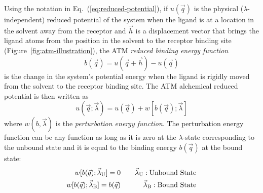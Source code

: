 \documentclass[9pt,bestpractices]{livecoms}
\begin{document}
Using the notation in Eq.~(\ref{eq:reduced-potential}), if $u(\vec{q})$ is the physical ($\lambda$-independent) reduced potential of the system when the ligand is at a location in the solvent away from the receptor and $\vec{h}$ is a displacement vector that brings the ligand atoms from the position in the solvent to the receptor binding site (Figure~\ref{fig:atm-illustration}), the ATM \emph{reduced binding energy function}
\begin{equation}\label{eq:ATM-binding-energy}
b(\vec{q}) = u(\vec{q}+\vec{h}) - u(\vec{q})
\end{equation}
is the change in the system's potential energy when the ligand is rigidly moved from the solvent to the receptor binding site. The ATM alchemical reduced potential is then written as
\begin{equation}\label{eq:ATM-alchemical-potential}
    u(\vec{q}; \vec{\lambda}) = u(\vec{q}) + w[b(\vec{q});\vec{\lambda}]
\end{equation}
where $w(b,\vec{\lambda})$ is the \emph{perturbation energy function}. The perturbation energy function can be any function as long as it is zero at the $\lambda$-state corresponding to the unbound state and it is equal to the binding energy $b(\vec{q})$ at the bound state:
\begin{eqnarray}
    w[b(\vec{q});\vec{\lambda}_{\rm U}] = 0           & \quad & \vec{\lambda}_{\rm U}: {\rm Unbound\ State} \\
    w[b(\vec{q});\vec{\lambda}_{\rm B}] = b(\vec{q})  & \quad & \vec{\lambda}_{\rm B}: {\rm Bound\ State}
\end{eqnarray}
\end{document}
